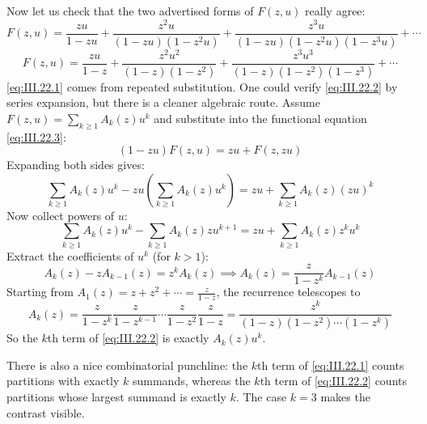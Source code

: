Now let us check that the two advertised forms of $F(z, u)$ really agree:
\begin{equation} \label{eq:III.22.1}
    F(z, u) = \frac{zu}{1 - zu} + \frac{z^{2}u}{(1 - zu)(1 - z^{2}u)} + \frac{z^{3}u}{(1 - zu)(1 - z^{2}u)(1 - z^{3}u)} + \cdots
\end{equation}
\begin{equation} \label{eq:III.22.2}
    F(z, u) = \frac{zu}{1 - z} + \frac{z^{2}u^{2}}{(1 - z)(1 - z^{2})} + \frac{z^{3}u^{3}}{(1 - z)(1 - z^{2})(1 - z^{3})} + \cdots
\end{equation}
\eqref{eq:III.22.1} comes from repeated substitution. One could verify \eqref{eq:III.22.2} by series expansion, but there is a cleaner algebraic route.
Assume $F(z, u) = \sum_{k \geq 1} A_{k}(z)u^{k}$ and substitute into the functional equation \eqref{eq:III.22.3}:
\begin{equation*}
    (1 - zu)F(z, u) = zu + F(z, zu)
\end{equation*}
Expanding both sides gives:
\begin{equation*}
    \sum_{k \geq 1} A_{k}(z)u^{k} - zu\left(\sum_{k \geq 1} A_{k}(z)u^{k}\right) = zu + \sum_{k \geq 1} A_{k}(z)(zu)^{k}
\end{equation*}
Now collect powers of $u$:
\begin{equation*}
    \sum_{k \geq 1} A_{k}(z)u^{k} - \sum_{k \geq 1} A_{k}(z)zu^{k + 1} = zu + \sum_{k \geq 1} A_{k}(z)z^{k}u^{k}
\end{equation*}
Extract the coefficients of $u^{k}$ (for $k > 1$):
\begin{equation} \label{eq:III.22.4}
    A_{k}(z) - zA_{k - 1}(z) = z^{k}A_{k}(z) \implies A_{k}(z) = \frac{z}{1 - z^{k}}A_{k - 1}(z)
\end{equation}
Starting from $A_{1}(z) = z + z^{2} + \cdots = \frac{z}{1 - z}$, the recurrence telescopes to
\begin{equation*}
    A_{k}(z) = \frac{z}{1 - z^{k}} \frac{z}{1 - z^{k - 1}} \cdots \frac{z}{1 - z^{2}} \frac{z}{1 - z}
        = \frac{z^{k}}{(1 - z)(1 - z^{2}) \cdots (1 -z^{k})}
\end{equation*}
So the $k$th term of \eqref{eq:III.22.2} is exactly $A_{k}(z)u^{k}$.

There is also a nice combinatorial punchline: the $k$th term of \eqref{eq:III.22.1} counts partitions with exactly $k$ summands, whereas the $k$th term of \eqref{eq:III.22.2} counts partitions whose largest summand is exactly $k$.
The case $k = 3$ makes the contrast visible.

